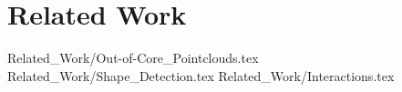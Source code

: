 \chapter {Related Work}
 {Related_Work/Out-of-Core_Pointclouds.tex}
 {Related_Work/Shape_Detection.tex}
 {Related_Work/Interactions.tex}